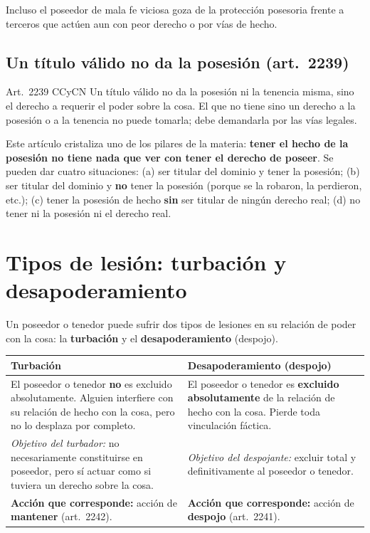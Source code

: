 \documentclass[12pt,oneside]{book}
\begin{document}
Incluso el poseedor de mala fe viciosa goza de la protección posesoria frente a terceros que actúen aun con peor derecho o por vías de hecho.

\subsection{Un título válido no da la posesión (art.~2239)}

\begin{regla}{Art.~2239 CCyCN}
Un título válido no da la posesión ni la tenencia misma, sino el derecho a requerir el poder sobre la cosa. El que no tiene sino un derecho a la posesión o a la tenencia no puede tomarla; debe demandarla por las vías legales.
\end{regla}

Este artículo cristaliza uno de los pilares de la materia: \textbf{tener el hecho de la posesión no tiene nada que ver con tener el derecho de poseer}. Se pueden dar cuatro situaciones: (a) ser titular del dominio y tener la posesión; (b) ser titular del dominio y \textbf{no} tener la posesión (porque se la robaron, la perdieron, etc.); (c) tener la posesión de hecho \textbf{sin} ser titular de ningún derecho real; (d) no tener ni la posesión ni el derecho real.

\section{Tipos de lesión: turbación y desapoderamiento}

Un poseedor o tenedor puede sufrir dos tipos de lesiones en su relación de poder con la cosa: la \textbf{turbación} y el \textbf{desapoderamiento} (despojo).

\begin{table}[H]
\centering
\begin{tabularx}{\textwidth}{@{}>{\raggedright\arraybackslash}X>{\raggedright\arraybackslash}X@{}}
\toprule
\textbf{Turbación} & \textbf{Desapoderamiento (despojo)} \\
\midrule
El poseedor o tenedor \textbf{no} es excluido absolutamente. Alguien interfiere con su relación de hecho con la cosa, pero no lo desplaza por completo. & El poseedor o tenedor es \textbf{excluido absolutamente} de la relación de hecho con la cosa. Pierde toda vinculación fáctica. \\
\addlinespace
\textit{Objetivo del turbador:} no necesariamente constituirse en poseedor, pero sí actuar como si tuviera un derecho sobre la cosa. & \textit{Objetivo del despojante:} excluir total y definitivamente al poseedor o tenedor. \\
\addlinespace
\textbf{Acción que corresponde:} acción de \textbf{mantener} (art.~2242). & \textbf{Acción que corresponde:} acción de \textbf{despojo} (art.~2241). \\
\bottomrule
\end{tabularx}
\end{table}
\end{document}

